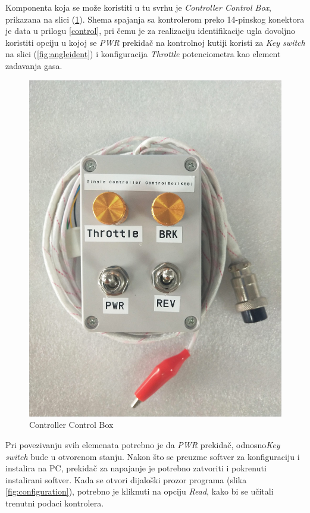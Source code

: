 Komponenta koja se može koristiti u tu svrhu je \textit{Controller Control Box}, prikazana na slici (\ref{fig:controlbox}). Shema spajanja sa kontrolerom preko 14-pinskog konektora je data u prilogu \ref{control}, pri čemu je za realizaciju identifikacije ugla dovoljno koristiti opciju u kojoj se \textit{PWR} prekidač na kontrolnoj kutiji koristi za \textit{Key switch} na slici (\ref{fig:angleident}) i konfiguracija \textit{Throttle} potenciometra kao element zadavanja gasa.

\begin{figure}
\centering
\includegraphics[scale=0.1]{slike/controlbox.jpg}
\caption{Controller Control Box}
\label{fig:controlbox}
\end{figure}

Pri povezivanju svih elemenata potrebno je da \textit{PWR} prekidač, odnosno\textit{Key switch} bude u otvorenom stanju. Nakon što se preuzme softver za konfiguraciju i instalira na PC, prekidač za napajanje je potrebno zatvoriti i pokrenuti instalirani softver. Kada se otvori dijaloški prozor programa (slika \ref{fig:configuration}), potrebno je kliknuti na opciju \textit{Read}, kako bi se učitali trenutni podaci kontrolera.


